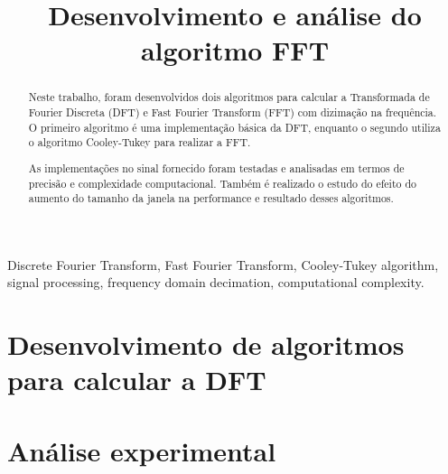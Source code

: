 \documentclass[conference]{IEEEtran}
\begin{document}
   \makeatletter
    \newcommand{\linebreakand}{%
      \end{@IEEEauthorhalign}
      \hfill\mbox{}\par
      \mbox{}\hfill\begin{@IEEEauthorhalign}
    }
    \makeatother

\title{Desenvolvimento e análise do algoritmo FFT\\
}

\author{
\IEEEauthorblockN{}
\IEEEauthorblockA{}
}

\maketitle

\begin{abstract}
    Neste trabalho, foram desenvolvidos dois algoritmos para calcular a Transformada de Fourier Discreta (DFT) e Fast Fourier Transform (FFT) com dizimação na frequência. O primeiro algoritmo é uma implementação básica da DFT, enquanto o segundo utiliza o algoritmo Cooley-Tukey para realizar a FFT. 

    As implementações no sinal fornecido foram testadas e analisadas em termos de precisão e complexidade computacional. Também é realizado o estudo do efeito do aumento do tamanho da janela na performance e resultado desses algoritmos.
\end{abstract}

\begin{IEEEkeywords}
    Discrete Fourier Transform, Fast Fourier Transform, Cooley-Tukey algorithm, signal processing, frequency domain decimation, computational complexity.
\end{IEEEkeywords}

\section{Desenvolvimento de algoritmos para calcular a DFT}


\section{Análise experimental}

\end{document}

